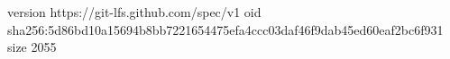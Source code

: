 version https://git-lfs.github.com/spec/v1
oid sha256:5d86bd10a15694b8bb7221654475efa4ccc03daf46f9dab45ed60eaf2bc6f931
size 2055
